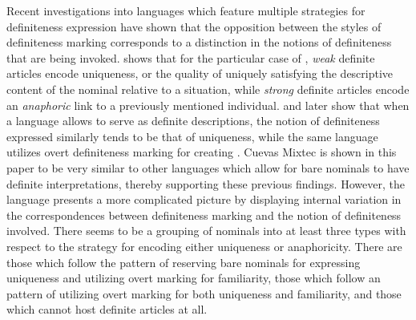 \documentclass[output=paper,modfonts,nonflat]{langsci/langscibook}
\begin{document}
Recent investigations into languages which feature multiple strategies for definiteness expression have shown that the opposition between the styles of definiteness marking corresponds to a distinction in the notions of definiteness that are being invoked.  \citet{Schwarz2009} shows that for the particular case of , \textit{weak} definite articles encode uniqueness, or the quality of uniquely satisfying the descriptive content of the nominal relative to a situation, while \textit{strong} definite articles encode an \textit{anaphoric} link to a previously mentioned individual.  \citet{Schwarz2013} and \citet{Jenks2015} later show that when a language allows  to serve as definite descriptions, the notion of definiteness expressed similarly tends to be that of uniqueness, while the same language utilizes overt definiteness marking for creating .  Cuevas Mixtec is shown in this paper to be very similar to other languages which allow for bare nominals to have definite interpretations, thereby supporting these previous findings.  However, the language presents a more complicated picture by displaying internal variation in the correspondences between definiteness marking and the notion of definiteness involved.  There seems to be a grouping of nominals into at least three types with respect to the strategy for encoding either uniqueness or anaphoricity.  There are those which follow the pattern of reserving bare nominals for expressing uniqueness and utilizing overt marking for familiarity, those which follow an  pattern of utilizing overt marking for both uniqueness and familiarity, and those which cannot host definite articles at all.
\end{document}
